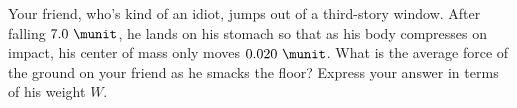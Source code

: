 Your friend, who's kind of an idiot, jumps out of a third-story
window. After falling $7.0\ \munit$, he lands on his stomach so that
as his body compresses on impact, his center of mass only moves
$0.020\ \munit$. What is the
average force of the ground on your friend as he smacks the floor?
Express your answer in terms of his weight $W$.
